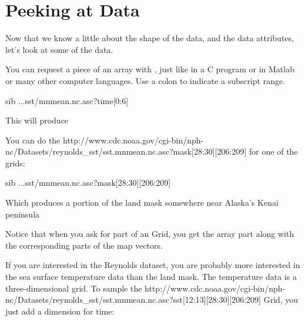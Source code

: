 \documentclass{dods-book}
\begin{document}
\section{Peeking at Data}

Now that we know a little about the shape of the data, and the data
attributes, let's look at some of the data.

You can request a piece of an array with ,
just like in a C program or in Matlab or many other computer
languages.  Use a colon to indicate a subscript range.

\begin{vcode}{sib}
...sst/mnmean.nc.asc?time[0:6]
\end{vcode}

This  will produce 


You can do the 
{http://www.cdc.noaa.gov/cgi-bin/nph-nc/Datasets/reynolds_sst/sst.mnmean.nc.asc?mask[28:30][206:209]}
for one of the grids:

\begin{vcode}{sib}
...sst/mnmean.nc.asc?mask[28:30][206:209]
\end{vcode}

Which produces a portion of the land mask somewhere near Alaska's
Kenai peninsula


Notice that when you ask for part of an \opendap Grid, you get the array
part along with the corresponding parts of the map vectors.

If you are interested in the Reynolds dataset, you are probably more
interested in the sea surface temperature data than the land mask.
The temperature data is a three-dimensional grid.  To sample the 
{http://www.cdc.noaa.gov/cgi-bin/nph-nc/Datasets/reynolds_sst/sst.mnmean.nc.asc?sst[12:13][28:30][206:209]}
Grid, you
just add a dimension for time:
\end{document}

